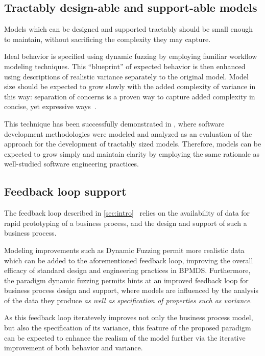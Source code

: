 \documentclass[draft,12pt]{llncs}  %
\begin{document}
\subsection{Tractably design-able and support-able models}
Models which can be designed and supported tractably should be small enough to
maintain, without sacrificing the complexity they may capture.
\par

Ideal behavior is specified using dynamic fuzzing by employing familiar workflow
modeling techniques. This ``blueprint'' of expected behavior is then enhanced
using descriptions of realistic variance separately to the original model. Model
size should be expected to grow slowly with the added complexity of variance in
this way: separation of concerns is a proven way to capture added complexity in
concise, yet expressive ways~\citep{kiczales1997aspect}.
\par

This technique has been successfully demonstrated in \cite{wallis2018modelling},
where software development methodologies were modeled and analyzed as an
evaluation of the approach for the development of tractably sized models.
Therefore, models can be expected to grow simply and maintain clarity by
employing the same rationale as well-studied software engineering practices.
\par

\subsection{Feedback loop support}
The feedback loop described in \cref{sec:intro}~ relies on the availability of data for rapid prototyping of a
business process, and the design and support of such a business process.
\par

Modeling improvements such as Dynamic Fuzzing permit more realistic data which
can be added to the aforementioned feedback loop, improving the overall efficacy
of standard design and engineering practices in BPMDS. Furthermore, the paradigm
dynamic fuzzing permits hints at an improved feedback loop for business process
design and support, where models are influenced by the analysis of the data they
produce \emph{as well as specification of properties such as variance}. 
\par


As this feedback loop iteratevely improves not only the business process model,
but also the specification of its variance, this feature of the proposed
paradigm can be expected to enhance the realism of the model further via the
iterative improvement of both behavior and variance.
\par
\end{document}
